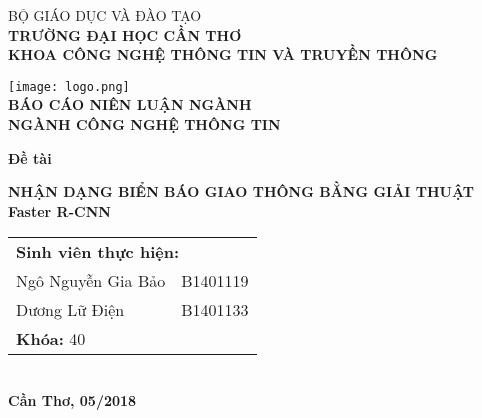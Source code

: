 \documentclass[../thesis.tex]{subfiles}
\begin{document}
\begin{titlepage}

\begin{center}

BỘ GIÁO DỤC VÀ ĐÀO TẠO\\
\textbf{TRƯỜNG ĐẠI HỌC CẦN THƠ\\}
\textbf{KHOA CÔNG NGHỆ THÔNG TIN VÀ TRUYỀN THÔNG\\[1cm]}

\texttt{[image: logo.png]}\\[1cm]

\textbf{BÁO CÁO NIÊN LUẬN NGÀNH\\}
\textbf{NGÀNH CÔNG NGHỆ THÔNG TIN\\[2cm]}

\begin{large}
\textbf{Đề tài\\[0.5cm]}
\end{large}
\textbf{{\LARGE NHẬN DẠNG BIỂN BÁO GIAO THÔNG BẰNG GIẢI THUẬT Faster R-CNN}}
\\[3.5cm]

\begin{tabular}{ l l }
	\multicolumn{2}{l}{\textbf{Sinh viên thực hiện:}}\\ 
	Ngô Nguyễn Gia Bảo & B1401119\\  
	Dương Lữ Điện & B1401133\\
	\multicolumn{2}{l}{\textbf{Khóa:} 40}\\   
\end{tabular}
\\[4cm]

\textbf{Cần Thơ, 05/2018}

\end{center}

\end{titlepage}
\end{document}
